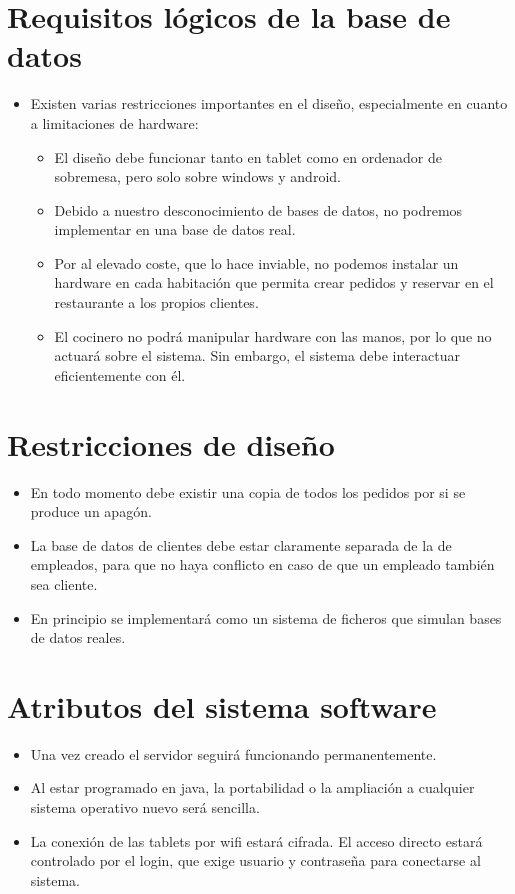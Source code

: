 \documentclass[spanish,a4paper,11pt, twoside]{report}	%
\begin{document}
\section{Requisitos lógicos de la base de datos}
\begin{itemize}
	\item Existen varias restricciones importantes en el diseño, especialmente en cuanto a limitaciones de hardware:
	\begin{itemize}
		\item El diseño debe funcionar tanto en tablet como en ordenador de sobremesa,  pero solo sobre windows y android.
		\item Debido a nuestro desconocimiento de bases de datos, no podremos implementar en una base de datos real.
		\item Por al elevado coste, que lo hace inviable, no podemos instalar un hardware en cada habitación que permita crear pedidos y reservar en el restaurante a los propios clientes.
		\item El cocinero no podrá manipular hardware con las manos, por lo que no actuará sobre el sistema. Sin embargo, el sistema debe interactuar eficientemente con él.
	\end{itemize}
\end{itemize}

\section{Restricciones de diseño}
\begin{itemize}
	\item En todo momento debe existir una copia de todos los pedidos por si se produce 	un apagón.
	\item La base de datos de clientes debe estar claramente separada de la de empleados, para que no haya conflicto en caso de que un empleado también sea cliente.
	\item En principio se implementará como un sistema de ficheros que simulan bases de datos reales.
\end{itemize}


\section{Atributos del sistema software}
\begin{itemize}
	\item Una vez creado el servidor seguirá funcionando permanentemente.
	\item Al estar programado en java, la portabilidad o la ampliación a cualquier sistema operativo  nuevo será sencilla. 
	\item La conexión de las tablets por wifi estará cifrada. El acceso directo estará controlado por el login, que exige usuario y contraseña para conectarse al sistema.
\end{itemize}


\newpage
\mbox{}
\thispagestyle{empty}						%
\newpage
\end{document}
